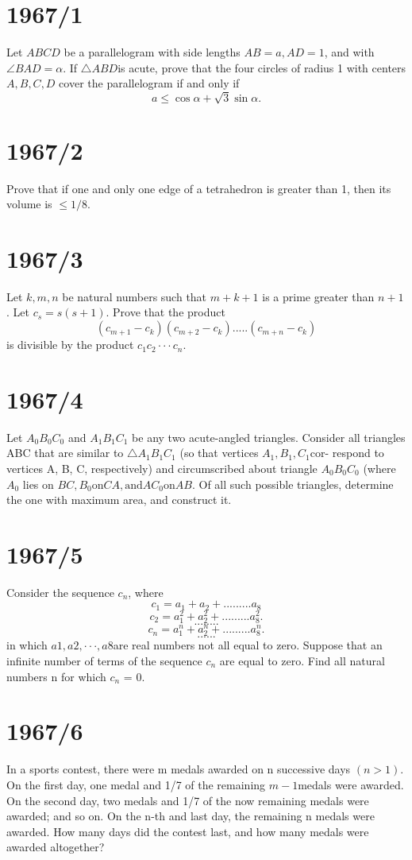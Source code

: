 \documentclass[12pt]{article}
\begin{document}
\section*{1967/1}
Let \(ABCD\) be a parallelogram with side lengths \(AB = a, AD = 1\), and with\(\angle{BAD}  = \alpha\). If \(\triangle{ABD}\)is acute, prove that the four circles of radius 1 with centers \(A, B, C, D\) cover the parallelogram if and only if
\[
a\leq \cos{\alpha} +\sqrt{3}\sin{\alpha}.
\]
\section*{1967/2}
Prove that if one and only one edge of a tetrahedron is greater than 1, then its volume is \(\leq 1/8\).
\section*{1967/3}
Let \(k, m, n\) be natural numbers such that \(m + k + 1\) is a prime greater than
\(n + 1\). Let \(c_{s} = s(s + 1)\). Prove that the product
\[
(c_{m+1}-c_{k})(c_{m+2}-c_{k}).....(c_{m+n}-c_{k})
\]
is divisible by the product \(c_{1}c_{2} · · · c_{n}\).
\section*{1967/4}
Let \(A_{0}B_{0}C_{0}\) and \(A_{1}B_{1}C_{1}\) be any two acute-angled triangles. Consider all triangles ABC that are similar to \(\triangle{A_{1}B_{1}C_{1}}\) (so that vertices \(A_{1}, B_{1}, C_{1}\)cor- respond to vertices A, B, C, respectively) and circumscribed about triangle \(A_{0}B_{0}C_{0}\) (where \(A_{0}\) lies on \(BC, B_{0} \text{on} CA, \text{and} AC_{0} \text{on} AB\). Of all such possible triangles, determine the one with maximum area, and construct it.
\section*{1967/5}
Consider the sequence {\(c_{n}\)}, where \\
\[
c_{1}=a_{1}+a_{2}+.........a_{8}
\]
\[
c_{2}=a_{1}^{2}+a_{2}^{2}+.........a_{8}^{2}.
\]
\[
........
\]
\[
c_{n}=a_{1}^{n}+a_{2}^{n}+.........a_{8}^{n}.
\]
\[
......
\]
in which \(a1, a2, · · · , a8\)are real numbers not all equal to zero. Suppose that an infinite number of terms of the sequence \({c_{n}}\) are equal to zero. Find all natural numbers n for which \(c_{n}\) = 0.
\section*{1967/6}
In a sports contest, there were m medals awarded on n successive days \((n > 1)\). On the first day, one medal and 1/7 of the remaining \(m-1\)medals were awarded. On the second day, two medals and 1/7 of the now remaining medals were awarded; and so on. On the n-th and last day, the remaining n medals were awarded. How many days did the contest last, and how many medals were awarded altogether?
\end{document}
